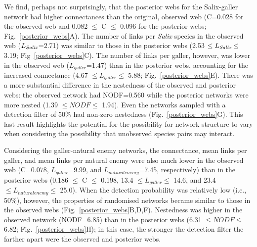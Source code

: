\documentclass[12pt]{article}
\begin{document}
\begin{spacing}{2.0}

    We find, perhaps not surprisingly, that the posterior webs for the Salix-galler network  had higher connectances than the original, observed web (C=0.028 for the observed web and 0.082 $\leq$ C $\leq$ 0.096 for the posterior webs; Fig.~\ref{posterior_webs}A). The number of links per \emph{Salix} species in the observed web ($L_{\emph{Salix}}$=2.71) was similar to those in the posterior webs (2.53 $\leq L_{\emph{Salix}} \leq$ 3.19; Fig~\ref{posterior_webs}C). The number of links per galler, however, was lower in the observed web ($L_{galler}$=1.47) than in the posterior webs, accounting for the increased connectance (4.67 $\leq L_{galler} \leq$ 5.88; Fig.~\ref{posterior_webs}E). There was a more substantial difference in the nestedness of the observed and posterior webs: the observed network had NODF=0.560 while the posterior networks were more nested (1.39 $\leq NODF \leq$ 1.94). Even the networks sampled with a detection filter of 50\% had non-zero nestedness (Fig.~\ref{posterior_webs}G). This last result highlights the potential for the possibility for network structure to vary when considering the possibility that unobserved species pairs may interact.


    Considering the galler-natural enemy networks, the connectance, mean links per galler, and mean links per natural enemy were also much lower in the observed web (C=0.078, $L_{galler}$=9.99, and $L_{natural enemy}$=7.45, respectively) than in the posterior webs (0.186 $\leq$ C $\leq$ 0.198, 13.4 $\leq L_{galler} \leq$ 14.6, and 23.4 $\leq L_{natural enemy} \leq$ 25.0). When the detection probability was relatively low (i.e., 50\%), however, the properties of randomised networks became similar to those in the observed webs (Fig.~\ref{posterior_webs}B,D,F). Nestedness was higher in the observed network (NODF=6.85) than in the posterior webs (6.31 $\leq NODF \leq$ 6.82; Fig.~\ref{posterior_webs}H); in this case, the stronger the detection filter the farther apart were the observed and posterior webs. 



\end{spacing}
\end{document}

